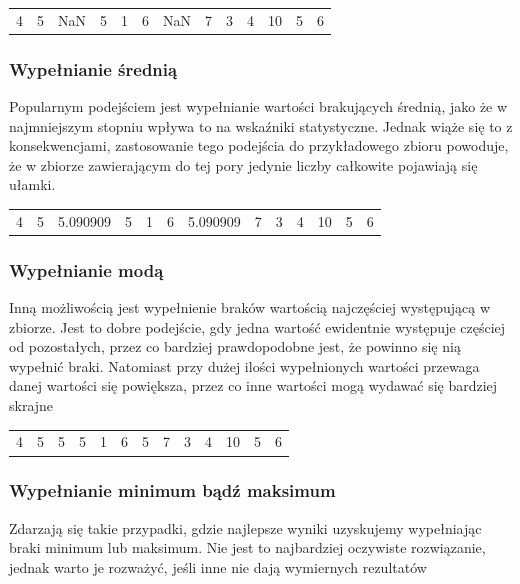 \documentclass[oneside]{book}
\begin{document}
\begin{table}[H]
    \begin{tabular}{lllllllllllll}
    4 & 5 & {\color[HTML]{FE0000} NaN} & 5 & 1 & 6 & {\color[HTML]{FE0000} NaN} & 7 & 3 & 4 & 10 & 5 & 6
    \end{tabular}

    \end{table}
    

\subsubsection*{Wypełnianie średnią}

Popularnym podejściem jest wypełnianie wartości 
brakujących średnią, jako że w najmniejszym stopniu 
wpływa to na wskaźniki statystyczne. Jednak wiąże się to z 
konsekwencjami, zastosowanie tego podejścia do przykładowego zbioru powoduje, 
że w zbiorze zawierającym do tej pory jedynie liczby całkowite pojawiają się ułamki.
\begin{table}[H]
    \begin{tabular}{lllllllllllll}
    4 & 5 & {\color[HTML]{FE0000} 5.090909} & 5 & 1 & 6 & {\color[HTML]{FE0000} 5.090909} & 7 & 3 & 4 & 10 & 5 & 6
    \end{tabular}
    \end{table}

\subsubsection*{Wypełnianie modą}

Inną możliwością jest wypełnienie braków 
wartością najczęściej występującą w zbiorze. 
Jest to dobre podejście, gdy jedna wartość 
ewidentnie występuje częściej od pozostałych, przez co 
bardziej prawdopodobne jest, że powinno się 
nią wypełnić braki. Natomiast przy dużej ilości wypełnionych
wartości przewaga danej wartości się powiększa, 
przez co inne wartości mogą wydawać się bardziej skrajne  

\begin{table}[H]
    \begin{tabular}{lllllllllllll}
    4 & 5 & {\color[HTML]{FE0000} 5} & 5 & 1 & 6 & {\color[HTML]{FE0000} 5} & 7 & 3 & 4 & 10 & 5 & 6
    \end{tabular}
    \end{table}

\subsubsection*{Wypełnianie minimum bądź maksimum}
Zdarzają się takie przypadki, gdzie najlepsze 
wyniki uzyskujemy wypełniając braki minimum lub maksimum.
Nie jest to najbardziej oczywiste rozwiązanie, 
jednak warto je rozważyć, jeśli inne nie dają wymiernych rezultatów
\end{document}
